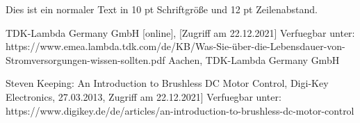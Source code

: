 \documentclass[10pt,a4paper,oneside,abstracton]{scrartcl}
\begin{document}
\begin{multicols}{2}
	
	


Dies ist ein normaler Text in 10 pt Schriftgröße und 12 pt Zeilenabstand.


\begin{thebibliography}{9}

TDK-Lambda Germany GmbH [online], [Zugriff am 22.12.2021] Verfuegbar unter:	https://www.emea.lambda.tdk.com/de/KB/Was-Sie-über-die-Lebensdauer-von-Stromversorgungen-wissen-sollten.pdf
Aachen, TDK-Lambda Germany GmbH



Steven Keeping: An Introduction to Brushless DC Motor Control, Digi-Key Electronics, 27.03.2013, Zugriff am 22.12.2021] Verfuegbar unter: https://www.digikey.de/de/articles/an-introduction-to-brushless-dc-motor-control


\end{thebibliography}
\end{multicols}
\end{document}
